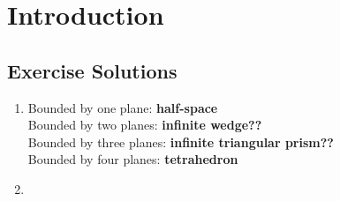 \chapter{Introduction}

\section*{Exercise Solutions}

\begin{enumerate}
	\item Bounded by one plane: \textbf{half-space} \\
	Bounded by two planes: \textbf{infinite wedge??} \\
	Bounded by three planes: \textbf{infinite triangular prism??} \\
	Bounded by four planes: \textbf{tetrahedron}
	
	\item 
\end{enumerate}